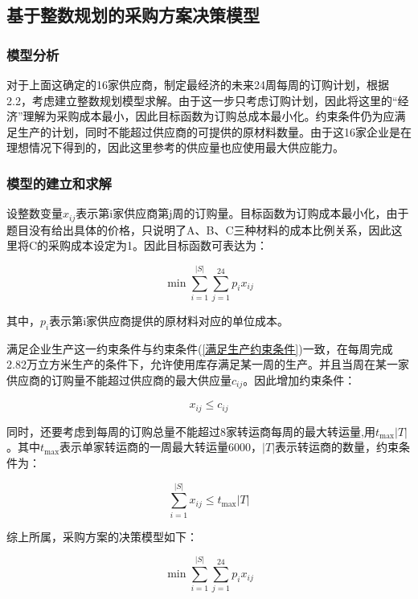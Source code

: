 \documentclass[withoutpreface,bwprint]{cumcmthesis} %
\begin{document}
\subsection{基于整数规划的采购方案决策模型}
\subsubsection{模型分析}
对于上面这确定的16家供应商，制定最经济的未来24周每周的订购计划，根据2.2，考虑建立整数规划模型求解。由于这一步只考虑订购计划，因此将这里的``经济''理解为采购成本最小，因此目标函数为订购总成本最小化。约束条件仍为应满足生产的计划，同时不能超过供应商的可提供的原材料数量。由于这16家企业是在理想情况下得到的，因此这里参考的供应量也应使用最大供应能力。

\subsubsection{模型的建立和求解}

设整数变量$x_{ij}$表示第i家供应商第j周的订购量。目标函数为订购成本最小化，由于题目没有给出具体的价格，只说明了A、B、C三种材料的成本比例关系，因此这里将C的采购成本设定为1。因此目标函数可表达为：

\begin{equation}
    \min \sum_{i = 1}^{|S|} \sum_{j = 1}^{24} p_i x_{ij}
\end{equation}

其中，$p_i$表示第i家供应商提供的原材料对应的单位成本。

满足企业生产这一约束条件与约束条件(\ref{满足生产约束条件})一致，在每周完成2.82万立方米生产的条件下，允许使用库存满足某一周的生产。并且当周在某一家供应商的订购量不能超过供应商的最大供应量$c_{i j}$。因此增加约束条件：

\begin{equation}
    x_{ij}\leq c_{ij}
\end{equation}

同时，还要考虑到每周的订购总量不能超过8家转运商每周的最大转运量,用$t_{\mathrm{max}}|T|$。其中$t_{\mathrm{max}}$表示单家转运商的一周最大转运量6000，$|T|$表示转运商的数量，约束条件为：

\begin{equation}
    \sum\limits_{i = 1}^{|S|} x_{ij} \leq t_{\mathrm{max}}|T|
\end{equation}

综上所属，采购方案的决策模型如下：

\begin{equation}
    \min \sum_{i = 1}^{|S|} \sum_{j = 1}^{24} p_i x_{ij}
\end{equation}
\end{document}
